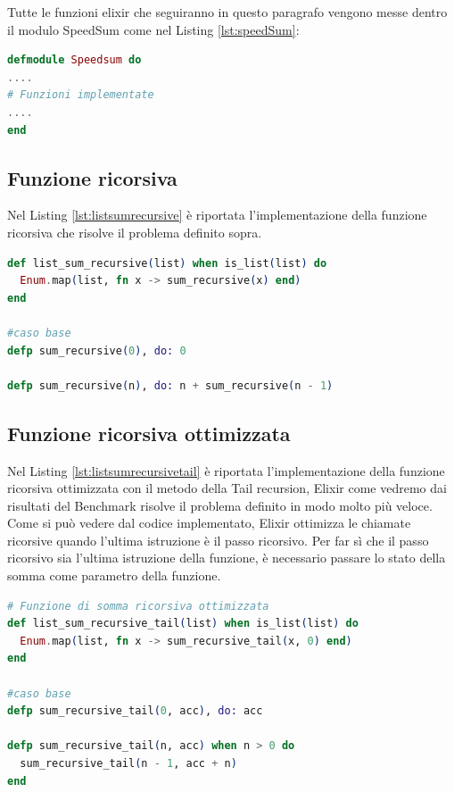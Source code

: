 Tutte le funzioni elixir che seguiranno in questo paragrafo
vengono messe dentro il modulo SpeedSum
come nel Listing \ref{lst:speedSum}:

\begin{lstlisting}[language=elixir,captionpos=b,
	caption={Modulo di riferimento},
	label={lst:speedSum}]
defmodule Speedsum do
....
# Funzioni implementate
....
end


\end{lstlisting}


\subsection{Funzione ricorsiva}
Nel Listing \ref{lst:listsumrecursive} è riportata l'implementazione
della funzione ricorsiva che risolve il problema definito sopra.

\begin{lstlisting}[language=elixir,captionpos=b,
	caption={Funzione list\_sum\_recursive()},
	label={lst:listsumrecursive}]
def list_sum_recursive(list) when is_list(list) do
  Enum.map(list, fn x -> sum_recursive(x) end)
end

#caso base
defp sum_recursive(0), do: 0

defp sum_recursive(n), do: n + sum_recursive(n - 1)
\end{lstlisting}

\subsection{Funzione ricorsiva ottimizzata}
Nel Listing \ref{lst:listsumrecursivetail} è riportata l'implementazione
della funzione ricorsiva ottimizzata con il metodo della Tail recursion,
Elixir come vedremo dai risultati del Benchmark risolve il problema
definito in modo molto più veloce.
Come si può vedere dal codice
implementato, Elixir ottimizza le chiamate ricorsive
quando l'ultima istruzione è il passo ricorsivo.
Per far sì che il passo ricorsivo sia l'ultima
istruzione della funzione, è necessario passare lo stato della
somma come parametro della funzione.

\begin{lstlisting}[language=elixir,captionpos=b,
	caption={Funzione list\_sum\_recursive\_tail()},
	label={lst:listsumrecursivetail}]
# Funzione di somma ricorsiva ottimizzata
def list_sum_recursive_tail(list) when is_list(list) do
  Enum.map(list, fn x -> sum_recursive_tail(x, 0) end)
end
  
#caso base
defp sum_recursive_tail(0, acc), do: acc

defp sum_recursive_tail(n, acc) when n > 0 do
  sum_recursive_tail(n - 1, acc + n)
end
\end{lstlisting}

